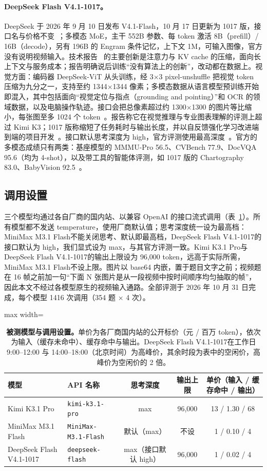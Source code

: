 \documentclass[11pt,a4paper,fontset=none]{ctexart}
\newcommand{\kimi}{Kimi K3.1 Pro}
\newcommand{\mini}{MiniMax M3.1 Flash}
\newcommand{\ds}{DeepSeek Flash V4.1-1017}
\begin{document}
\paragraph{\ds。}DeepSeek 于 2026 年 9 月 10 日发布 V4.1-Flash，10 月 17 日更新为 1017 版，接口名与价格不变~\cite{ds1017}；多模态 MoE，主干 552B 参数、每 token 激活 8B（prefill）/ 16B（decode），另有 196B 的 Engram 条件记忆，上下文 1M，可输入图像，官方没有说明视频输入。技术报告~\cite{dsv41} 的主要创新是注意力与 KV cache 的压缩，面向长上下文与服务成本；报告明确说后训练“没有算法上的创新”，改动都在数据上。视觉方面：编码器 DeepSeek-ViT 从头训练，经 3$\times$3 pixel-unshuffle 把视觉 token 压缩为九分之一，支持至约 1344$\times$1344 像素；多模态数据从语言模型预训练开始即混入，其中包括面向“视觉定位与指点（grounding and pointing）”和 OCR 的领域数据，以及电脑操作轨迹。接口会把总像素超过约 1300$\times$1300 的图片等比缩小，每张图至多 1024 个 token~\cite{dsapi}。报告称它在视觉推理与专业图表理解的评测上超过 Kimi K3；1017 版称缩短了任务耗时与输出长度，并以自反馈强化学习改进端到端的项目开发~\cite{ds1017}。接口默认思考深度为 high，官方评测使用最高深度~\cite{dsapi,ds1017}。官方的多模态成绩只有两类：基座模型的 MMMU-Pro 56.5、CVBench 77.9、DocVQA 95.6（均为 4-shot），以及带工具的智能体评测，如 1017 版的 Chartography 83.0、BabyVision 92.5~\cite{ds1017}。

\subsection{调用设置}

三个模型均通过各自厂商的国内站、以兼容 OpenAI 的接口流式调用（表~\ref{tab:models}）。所有模型都不发送 temperature，使用厂商默认值；思考深度统一设为最高档：\mini 不能关闭思考、默认即最高档，\ds 的接口默认为 high，我们显式设为 max，与其官方评测一致。\kimi 与 \ds 的输出上限设为 96,000 token，远高于实际所需，\mini 不设上限。图片以 base64 内嵌，置于题目文字之前；视频题在 16 帧之前加一句“下面 N 张图片是从一段视频中按时间顺序均匀抽取的帧”，因此本文不经过各模型原生的视频输入通路。全部评测于 2026 年 10 月 31 日完成，每个模型 1416 次调用（354 题 × 4 次）。

\begin{table}[t]
  \centering
  \caption{\textbf{被测模型与调用设置。}单价为各厂商国内站的公开标价（元 / 百万 token），依次为输入（缓存未命中）、缓存命中与输出。\ds 在工作日 9:00--12:00 与 14:00--18:00（北京时间）为高峰价，其余时段为表中的空闲价，高峰价为空闲价的 2 倍。}
  \label{tab:models}
  \small
  \begin{adjustbox}{max width=\linewidth}
  \begin{tabular}{llccc}
    \toprule
    模型 & API 名称 & 思考深度 & 输出上限 & 单价（输入 / 缓存命中 / 输出） \\
    \midrule
    \kimi & \texttt{kimi-k3.1-pro} & max & 96,000 & 13 / 1.30 / 68 \\
    \mini & \texttt{MiniMax-M3.1-Flash} & 默认（max） & 不设 & 1 / 0.10 / 4 \\
    \ds & \texttt{deepseek-flash} & max（接口默认 high） & 96,000 & 1 / 0.02 / 4 \\
    \bottomrule
  \end{tabular}
  \end{adjustbox}
\end{table}
\end{document}
